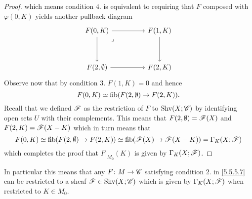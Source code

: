 \documentclass[../../thesis.tex]{subfiles}
\begin{document}
\begin{proof}
    which means condition $4.$ is equivalent to requiring that $F$ composed with $\varphi(0,K)$ yields another pullback diagram
    \[\begin{tikzcd}
            {F(0,K)} && {F(1,K)} \\
            \\
            {F(2,\emptyset)} && {F(2,K)}
            \arrow[from=1-1, to=1-3]
            \arrow[from=1-3, to=3-3]
            \arrow[from=3-1, to=3-3]
            \arrow[from=1-1, to=3-1]
            \arrow["\lrcorner"{anchor=center, pos=0.125}, draw=none, from=1-1, to=3-3]
        \end{tikzcd}\]
    Observe now that by condition $3.$ $F(1,K)=0$ and hence
    \[
        F(0,K)\simeq \operatorname{fib}(F(2,\emptyset) \to F(2,K)).
    \]
    Recall that we defined $\mathscr{F}$ as the restriction of $F$ to $\mathrm{Shv}(X;\mathscr{C})$ by identifying open sets $U$ with their complements.
    This means that $F(2,\emptyset) = \mathscr{F}(X)$ and $F(2,K) = \mathscr{F}(X-K)$ which in turn means that
    \[
        F(0,K)\simeq \operatorname{fib}(F(2,\emptyset) \to F(2,K)) \simeq \operatorname{fib}(\mathscr{F}(X) \to \mathscr{F}(X-K)) = \Gamma_K(X;\mathscr{F})
    \]
    which completes the proof that $F|_{M_0}(K)$ is given by $\Gamma_K(X;\mathscr{F})$.
\end{proof}
\begin{corollary}
    In particular this means that any $F\colon M \to \mathscr{C}$ satisfying condition $2.$ in \ref{5.5.5.7} can be restricted to a sheaf $\mathscr{F}\in\mathrm{Shv}(X;\mathscr{C})$ which is given by $\Gamma_K(X;\mathscr{F})$ when restricted to $K \in M_0$.
\end{corollary}
\end{document}
